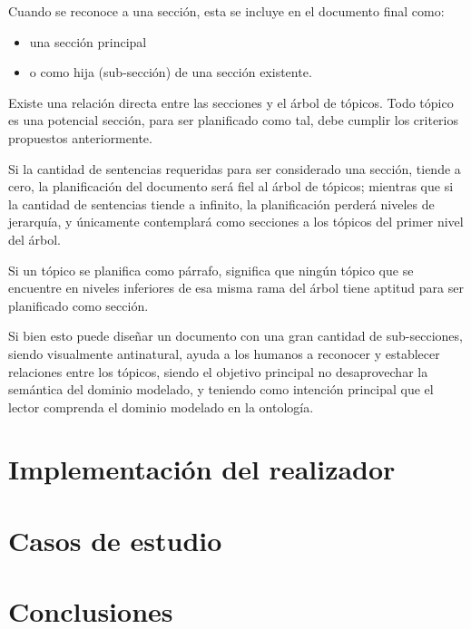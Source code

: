 Cuando se reconoce a una sección, esta se incluye en el documento final como: \begin{itemize}
    \item una sección principal
    \item o como hija (sub-sección) de una sección existente.
\end{itemize}

Existe una relación directa entre las secciones y el árbol de tópicos. Todo tópico es una potencial sección, para ser planificado como tal, debe cumplir los criterios propuestos anteriormente. 

Si la cantidad de sentencias requeridas para ser considerado una sección, tiende a cero, la planificación del documento será fiel al árbol de tópicos; mientras que si la cantidad de sentencias tiende a infinito, la planificación perderá niveles de jerarquía, y únicamente contemplará como secciones a los tópicos del primer nivel del árbol.   

Si un tópico se planifica como párrafo, significa que ningún tópico que se encuentre en niveles inferiores de esa misma rama del árbol tiene aptitud para ser planificado como sección.

Si bien esto puede diseñar un documento con una gran cantidad de sub-secciones, siendo visualmente antinatural, ayuda a los humanos a reconocer y establecer relaciones entre los tópicos, siendo el objetivo principal no desaprovechar la semántica del dominio modelado, y teniendo como intención principal que el lector comprenda el dominio modelado en la ontología.

\section{Implementación del realizador}

\section{Casos de estudio}


\section{Conclusiones}

